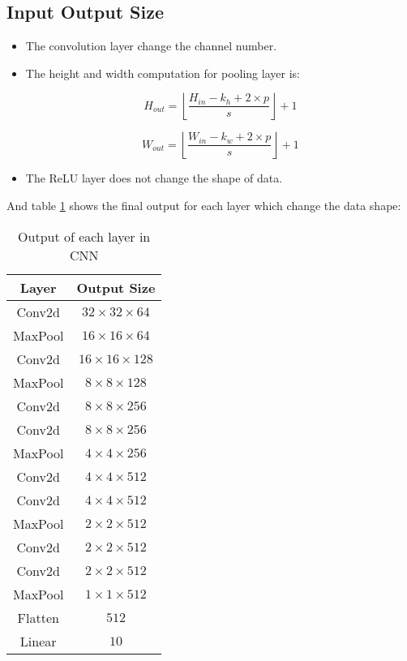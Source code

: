 \subsection{Input Output Size}

\begin{itemize}
  \item The convolution layer change the channel number.

  \item {
      The height and width computation for pooling layer is:

      $$ H_{out} = \left\lfloor \frac{H_{in} - k_{h} + 2 \times p}{s} \right\rfloor + 1 $$

      $$ W_{out} = \left\lfloor \frac{W_{in} - k_{w} + 2 \times p}{s} \right\rfloor + 1 $$
    }

  \item The ReLU layer does not change the shape of  data.
\end{itemize}

And table \ref{tab:network_layers} shows the final output for each layer which change the data shape:

\begin{table}[!ht]
  \centering\caption{Output of each layer in CNN}
  \label{tab:network_layers}
  \begin{tabular}{|c|c|}
    \hline
    \textbf{Layer} & \textbf{Output Size} \\
    \hline
    Conv2d & $32 \times 32 \times 64$ \\ \hline
    MaxPool & $16 \times 16 \times 64$ \\ \hline
    Conv2d & $16 \times 16 \times 128$ \\ \hline
    MaxPool & $8 \times 8 \times 128$ \\ \hline
    Conv2d & $8 \times 8 \times 256$ \\ \hline
    Conv2d & $8 \times 8 \times 256$ \\ \hline
    MaxPool & $4 \times 4 \times 256$ \\ \hline
    Conv2d & $4 \times 4 \times 512$ \\ \hline
    Conv2d & $4 \times 4 \times 512$ \\ \hline
    MaxPool & $2 \times 2 \times 512$ \\ \hline
    Conv2d & $2 \times 2 \times 512$ \\ \hline
    Conv2d & $2 \times 2 \times 512$ \\ \hline
    MaxPool & $1 \times 1 \times 512$ \\ \hline
    Flatten & $512$ \\ \hline
    Linear & $10$ \\ \hline
  \end{tabular}
\end{table}
